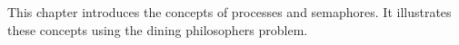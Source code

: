 \secdown

This chapter introduces the concepts of processes and semaphores. It
illustrates these concepts using the dining philosophers problem.


\secup
